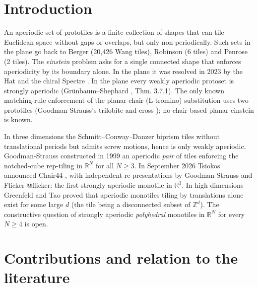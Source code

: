 \documentclass[11pt,a4paper]{article}
\theoremstyle{plain}
\theoremstyle{definition}
\begin{document}
\section{Introduction}

An aperiodic set of prototiles is a finite collection of shapes that can tile Euclidean space without gaps or overlaps, but only non-periodically. Such sets in the plane go back to Berger \cite{berger} (20,426 Wang tiles), Robinson \cite{robinson} (6 tiles) and Penrose \cite{penrose} (2 tiles). The \emph{einstein} problem asks for a single connected shape that enforces aperiodicity by its boundary alone. In the plane it was resolved in 2023 by the Hat \cite{hat} and the chiral Spectre \cite{spectre}. In the plane every weakly aperiodic protoset is strongly aperiodic (Grünbaum--Shephard \cite{gs87}, Thm. 3.7.1). The only known matching-rule enforcement of the planar chair (L-tromino) substitution uses two prototiles (Goodman-Strauss's trilobite and cross \cite{gs99b}); no chair-based planar einstein is known.

In three dimensions the Schmitt--Conway--Danzer biprism \cite{schmitt,danzer} tiles without translational periods but admits screw motions, hence is only weakly aperiodic. Goodman-Strauss \cite{gs99} constructed in 1999 an aperiodic \emph{pair} of tiles enforcing the notched-cube rep-tiling in $\mathbb{R}^N$ for all $N \ge  3$. In September 2026 Tsiokos announced Chair44 \cite{tsiokos}, with independent re-presentations by Goodman-Strauss \cite{gs2026} and Flicker @flicker: the first strongly aperiodic monotile in $\mathbb{R}^3$. In high dimensions Greenfeld and Tao \cite{gt} proved that aperiodic monotiles tiling by translations alone exist for some large $d$ (the tile being a disconnected subset of $\mathbb{Z}^d$). The constructive question of strongly aperiodic \emph{polyhedral} monotiles in $\mathbb{R}^N$ for every $N \ge  4$ is open.

\section{Contributions and relation to the literature}\label{sec:contrib}
\end{document}
